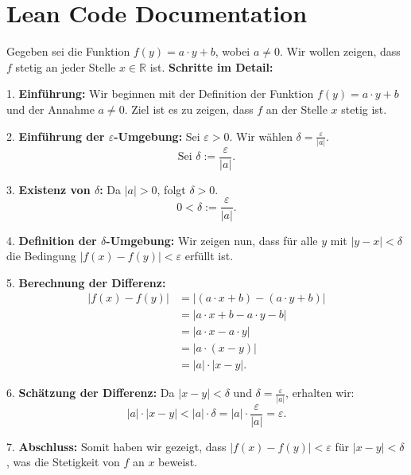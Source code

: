 \documentclass{article}
\begin{document}
\section*{Lean Code Documentation}

Gegeben sei die Funktion $f(y) = a \cdot y + b$, wobei $a \neq 0$. Wir wollen zeigen, dass $f$ stetig an jeder Stelle $x \in \mathbb{R}$ ist.
\textbf{Schritte im Detail:}

1. \textbf{Einführung:}
   Wir beginnen mit der Definition der Funktion $f(y) = a \cdot y + b$ und der Annahme $a \neq 0$. Ziel ist es zu zeigen, dass $f$ an der Stelle $x$ stetig ist. 

2. \textbf{Einführung der $\varepsilon$-Umgebung:}
   Sei $\varepsilon > 0$. Wir wählen $\delta = \frac{\varepsilon}{|a|}$.
   \[
   \text{Sei } \delta := \frac{\varepsilon}{|a|}.
   \]

3. \textbf{Existenz von $\delta$:}
   Da $|a| > 0$, folgt $\delta > 0$.
   \[
   0 < \delta := \frac{\varepsilon}{|a|}.
   \]

4. \textbf{Definition der $\delta$-Umgebung:}
   Wir zeigen nun, dass für alle $y$ mit $|y - x| < \delta$ die Bedingung $|f(x) - f(y)| < \varepsilon$ erfüllt ist. 

5. \textbf{Berechnung der Differenz:}
   \begin{align*}
   |f(x) - f(y)| &= |(a \cdot x + b) - (a \cdot y + b)| \\
   &= |a \cdot x + b - a \cdot y - b| \\
   &= |a \cdot x - a \cdot y| \\
   &= |a \cdot (x - y)| \\
   &= |a| \cdot |x - y|.
   \end{align*}

6. \textbf{Schätzung der Differenz:}
   Da $|x - y| < \delta$ und $\delta = \frac{\varepsilon}{|a|}$, erhalten wir:
   \[
   |a| \cdot |x - y| < |a| \cdot \delta = |a| \cdot \frac{\varepsilon}{|a|} = \varepsilon.
   \]

7. \textbf{Abschluss:}
   Somit haben wir gezeigt, dass $|f(x) - f(y)| < \varepsilon$ für $|x - y| < \delta$, was die Stetigkeit von $f$ an $x$ beweist.
\end{document}
